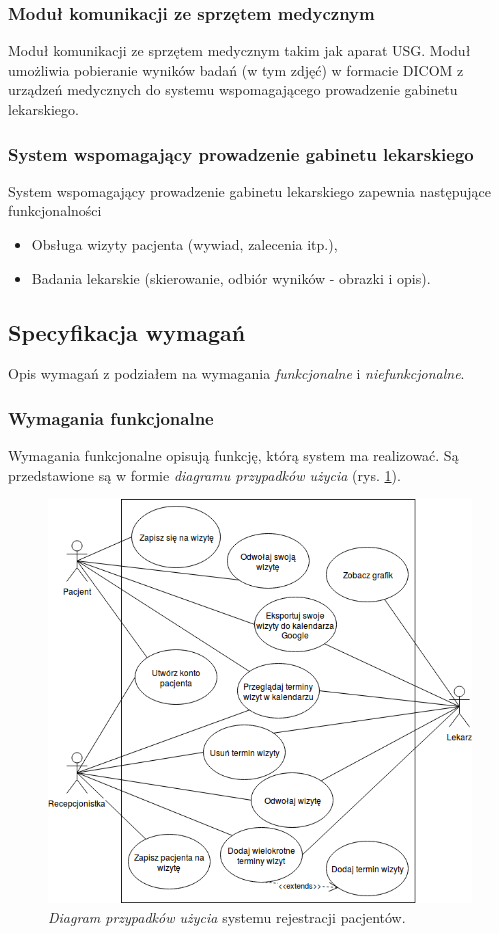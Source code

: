 \documentclass[polish,12pt]{aghthesis}
\begin{document}
\subsubsection{Moduł komunikacji ze sprzętem medycznym}
Moduł komunikacji ze sprzętem medycznym takim jak aparat USG. Moduł umożliwia pobieranie wyników badań (w tym zdjęć) w formacie DICOM z urządzeń medycznych do systemu wspomagającego prowadzenie gabinetu lekarskiego.
\subsubsection{System wspomagający prowadzenie gabinetu lekarskiego}
System wspomagający prowadzenie gabinetu lekarskiego zapewnia następujące funkcjonalności
\begin{itemize}
  \item Obsługa wizyty pacjenta (wywiad, zalecenia itp.),
  \item Badania lekarskie (skierowanie, odbiór wyników - obrazki i opis).
\end{itemize}

\subsection{Specyfikacja wymagań}
Opis wymagań z podziałem na wymagania \emph{funkcjonalne} i \emph{niefunkcjonalne}.

\subsubsection{Wymagania funkcjonalne}
Wymagania funkcjonalne opisują funkcję, którą system ma realizować. Są przedstawione są w formie \emph{diagramu przypadków użycia} (rys. \ref{use-case-v1}).
\begin{figure}[H]
        \includegraphics[width=\textwidth]{use-case-v1}
        \caption{\emph{Diagram przypadków użycia} systemu rejestracji pacjentów.}
        \label{use-case-v1}
\end{figure}
\end{document}
